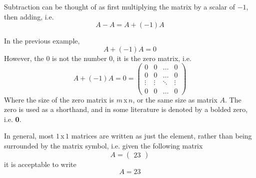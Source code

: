 \documentclass[diffeq.tex]{subfiles}
\begin{document}
    \begin{definition}[Subtraction]
        Subtraction can be thought of as first multiplying the matrix by a scalar of $-1$, then adding, i.e.
        \begin{equation}
            A - A = A + (-1)A
        \end{equation}
    \end{definition}
    \np
    \begin{definition}
        In the previous example,
        \begin{equation}
            A + (-1)A = 0
        \end{equation}
        However, the $0$ is not the number $0$, it is the zero matrix, i.e.
        \begin{equation}
            A + (-1)A = 0 = \begin{pmatrix}
                0 & 0 & \dots & 0\\
                0 & 0 & \dots & 0\\
                \vdots & \vdots & \ddots & \vdots\\
                0 & 0 & \dots & 0
            \end{pmatrix}
        \end{equation}
        Where the size of the zero matrix is $m$\,x\,$n$, or the same size as matrix $A$. The zero is used as a shorthand, and in some literature is denoted by a bolded zero, i.e. \textbf{0}.
    \end{definition}
    \begin{definition}[1x1 Matrices]
        In general, most $1$\,x\,$1$ matrices are written as just the element, rather than being surrounded by the matrix symbol, i.e. given the following matrix
        \begin{equation}
            A = \begin{pmatrix}
                23
            \end{pmatrix}
        \end{equation}
        it is acceptable to write
        \begin{equation}
            A = 23
        \end{equation}
    \end{definition}
\end{document}
